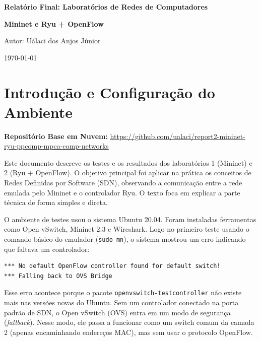 \documentclass[12pt,a4paper]{article}
\begin{document}
\begin{titlepage}
    \centering
    \vspace*{4cm}

    {\Huge \bfseries Relatório Final: Laboratórios de Redes de Computadores\par}
    \vspace{1.5cm}
    {\Large \bfseries Mininet e Ryu + OpenFlow\par}

    \vspace{4cm}
    {\Large Autor: Uálaci dos Anjos Júnior\par}

    \vfill
    {\large \today\par}
\end{titlepage}


\section{Introdução e Configuração do Ambiente}

\textbf{Repositório Base em Nuvem:} \url{https://github.com/ualaci/report2-mininet-ryu-ppcomp-mpca-comp-networks}

Este documento descreve os testes e os resultados dos laboratórios 1 (Mininet) e 2 (Ryu + OpenFlow). O objetivo principal foi aplicar na prática os conceitos de Redes Definidas por Software (SDN), observando a comunicação entre a rede emulada pelo Mininet e o controlador Ryu. O texto foca em explicar a parte técnica de forma simples e direta.

O ambiente de testes usou o sistema Ubuntu 20.04. Foram instaladas ferramentas como Open vSwitch, Mininet 2.3 e Wireshark.
Logo no primeiro teste usando o comando básico do emulador (\texttt{sudo mn}), o sistema mostrou um erro indicando que faltava um controlador:

\begin{lstlisting}
*** No default OpenFlow controller found for default switch!
*** Falling back to OVS Bridge
\end{lstlisting}

Esse erro acontece porque o pacote \texttt{openvswitch-testcontroller} não existe mais nas versões novas do Ubuntu. Sem um controlador conectado na porta padrão de SDN, o Open vSwitch (OVS) entra em um modo de segurança (\textit{fallback}). Nesse modo, ele passa a funcionar como um switch comum da camada 2 (apenas encaminhando endereços MAC), mas sem usar o protocolo OpenFlow.
\end{document}

